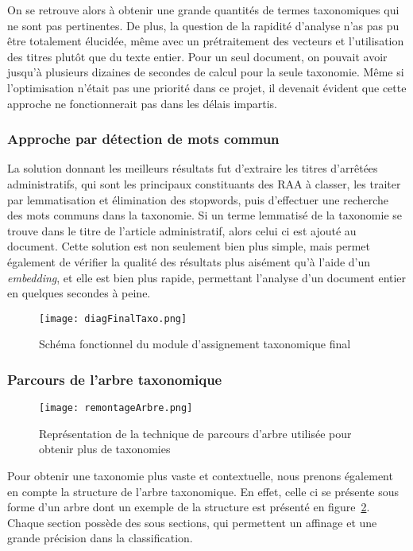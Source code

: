 On se retrouve alors à obtenir une grande quantités de termes taxonomiques qui ne sont pas pertinentes.
De plus, la question de la rapidité d'analyse n'as pas pu être totalement élucidée, même avec un prétraitement des vecteurs et l'utilisation des titres plutôt que du texte entier.
Pour un seul document, on pouvait avoir jusqu'à plusieurs dizaines de secondes de calcul pour la seule taxonomie.
Même si l'optimisation n'était pas une priorité dans ce projet, il devenait évident que cette approche ne fonctionnerait pas dans les délais impartis.


\subsubsection{Approche par détection de mots commun}
La solution donnant les meilleurs résultats fut d'extraire les titres d'arrêtées administratifs, qui sont les principaux constituants des RAA à classer, les traiter par lemmatisation et élimination des stopwords, puis d'effectuer une recherche des mots communs dans la taxonomie.
Si un terme lemmatisé de la taxonomie se trouve dans le titre de l'article administratif, alors celui ci est ajouté au document.
Cette solution est non seulement bien plus simple, mais permet également de vérifier la qualité des résultats plus aisément qu'à l'aide d'un \textit{embedding}, et elle est bien plus rapide, permettant l'analyse d'un document entier en quelques secondes à peine.

\begin{figure}[h!]
  \centering
  \texttt{[image: diagFinalTaxo.png]}
	\caption[]{Schéma fonctionnel du module d'assignement taxonomique final}
	\label{taxoFinal}
\end{figure}

\subsubsection{Parcours de l'arbre taxonomique}
\begin{figure}[h!]
  \centering
  \texttt{[image: remontageArbre.png]}
	\caption[]{Représentation de la technique de parcours d'arbre utilisée pour obtenir plus de taxonomies}
	\label{fig:tree}
\end{figure}


Pour obtenir une taxonomie plus vaste et contextuelle, nous prenons également en compte la structure de l'arbre taxonomique.
En effet, celle ci se présente sous forme d'un arbre dont un exemple de la structure est présenté en figure~\ref{fig:tree}. 
Chaque section possède des sous sections, qui permettent un affinage et une grande précision dans la classification.

